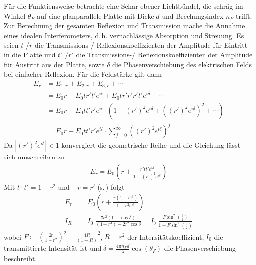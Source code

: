 Für die Funktionsweise betrachte eine Schar ebener Lichtbündel, die
schräg im Winkel
$\theta_F$
auf eine planparallele Platte mit Dicke $d$ und Brechungsindex $n_F$
trifft.
Zur Berechnung der gesamten Reflexion und Transmission mache die
Annahme eines idealen Interferometers, d.\,h. vernachlässige
Absorption und Streuung.
Es seien 
$t$%
%
/$r$%
die Transmissions-/ Reflexionskoeffizienten der
Amplitude für Eintritt in die Platte
und $t'$%
%
/$r'$%
die Transmissions-/ Reflexionskoeffizienten der
Amplitude für Austritt aus der Platte,
sowie $\delta$%
die Phasenverschiebung des elektrischen Felds bei einfacher Reflexion.
Für die Feldstärke gilt dann
\begin{align*}
  E_r &= E_{1,r} + E_{2,r} + E_{3,r} + \dotsb \\
      &= E_0r + E_0tr't'e^{i\delta} + E_0tr'r'r't'e^{i\delta} +
        \dotsb \\
      &= E_0r + E_0tt'r'e^{i\delta}\cdot\left(
        1 + {(r')}^{2}e^{i\delta} 
        + \left( {(r')}^{2}e^{i\delta} \right)^2 + \dotsb
        \right)\\
      &= E_0r + E_0tt'r'e^{i\delta}\cdot 
        \sum_{j=0}^{\infty}\left( {(r')}^{2}e^{i\delta} \right)^{j}
\end{align*}
Da $\left|(r')^2e^{i\delta}\right|<1$ konvergiert die geometrische
Reihe und die Gleichung lässt sich umschreiben zu
\begin{gather*}
  E_r = E_0\left( 
    r + \frac{r'tt'e^{i\delta}}{1-(r')^2e^{i\delta}} 
  \right)
\end{gather*}
Mit $t\cdot t' = 1-r^2$ und $-r=r'$ (s.\,) folgt
\begin{align*}
  E_r &= E_0\left( 
    r + \frac{r(1-e^{i\delta})}{1-r^2e^{i\delta}} 
  \right)\\
  I_R &= I_0\;\frac{2r^2(1-\cos\delta)}{(1+r^4)-2r^2\cos\delta} 
        = I_0\;\frac
        {F\sin^2\left(\frac{\delta}{2}\right)}
        {1+F\sin^2\left(\frac{\delta}{2}\right)}
\end{align*}
wobei $F\coloneqq \left(\frac{2r}{1-r^2}\right)^2 
= \frac{4R}{(1-R)}^2$,
$R=r^2$ der Intensitätskoeffizient,
$I_0$ die transmittierte Intensität
ist und
$\delta = \frac{4\pi n_F d}{\lambda}\cos(\theta_F)$
die Phasenverschiebung beschreibt.

